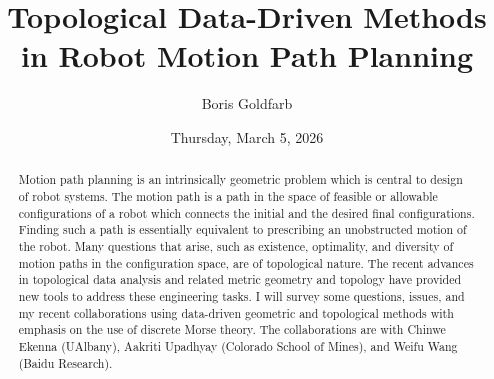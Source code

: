 \documentclass{UAmathtalk}
\author{Boris Goldfarb}
\title{Topological Data-Driven Methods in Robot Motion Path Planning}
\date{Thursday, March 5, 2026}
\begin{document}
\maketitle

\begin{abstract}
Motion path planning is an intrinsically geometric problem which is central to design of robot systems.  The motion path is a path in the space of feasible or allowable configurations of a robot which connects the initial and the desired final configurations.  Finding such a path is essentially equivalent to prescribing an unobstructed motion of the robot.  Many questions that arise, such as existence, optimality, and diversity of motion paths in the configuration space, are of topological nature.  The recent advances in topological data analysis and related metric geometry and topology have provided new tools to address these engineering tasks.  I will survey some questions, issues, and my recent collaborations using data-driven geometric and topological methods with emphasis on the use of discrete Morse theory.  The collaborations are with Chinwe Ekenna (UAlbany), Aakriti Upadhyay (Colorado School of Mines), and Weifu Wang (Baidu Research).
\end{abstract}
\end{document}
